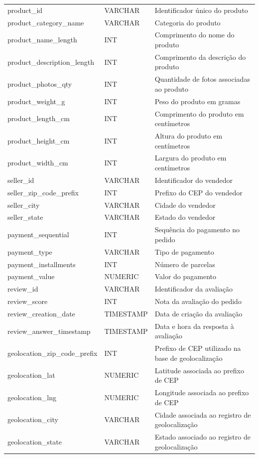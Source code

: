 \documentclass[12pt,a4paper]{article}
\begin{document}
{\begin{longtable}{
    |>{\raggedright\arraybackslash}p{5.5cm}
    |>{\raggedright\arraybackslash}p{2cm}
    |>{\raggedright\arraybackslash}p{6.8cm}|
}
product\_id & VARCHAR & Identificador único do produto \\
product\_category\_name & VARCHAR & Categoria do produto \\
product\_name\_length & INT & Comprimento do nome do produto \\
product\_description\_length & INT & Comprimento da descrição do produto \\
product\_photos\_qty & INT & Quantidade de fotos associadas ao produto \\
product\_weight\_g & INT & Peso do produto em gramas \\
product\_length\_cm & INT & Comprimento do produto em centímetros \\
product\_height\_cm & INT & Altura do produto em centímetros \\
product\_width\_cm & INT & Largura do produto em centímetros \\

seller\_id & VARCHAR & Identificador do vendedor \\
seller\_zip\_code\_prefix & INT & Prefixo do CEP do vendedor \\
seller\_city & VARCHAR & Cidade do vendedor \\
seller\_state & VARCHAR & Estado do vendedor \\

payment\_sequential & INT & Sequência do pagamento no pedido \\
payment\_type & VARCHAR & Tipo de pagamento \\
payment\_installments & INT & Número de parcelas \\
payment\_value & NUMERIC & Valor do pagamento \\

review\_id & VARCHAR & Identificador da avaliação \\
review\_score & INT & Nota da avaliação do pedido \\
review\_creation\_date & TIMESTAMP & Data de criação da avaliação \\
review\_answer\_timestamp & TIMESTAMP & Data e hora da resposta à avaliação \\

geolocation\_zip\_code\_prefix & INT & Prefixo de CEP utilizado na base de geolocalização \\
geolocation\_lat & NUMERIC & Latitude associada ao prefixo de CEP \\
geolocation\_lng & NUMERIC & Longitude associada ao prefixo de CEP \\
geolocation\_city & VARCHAR & Cidade associada ao registro de geolocalização \\
geolocation\_state & VARCHAR & Estado associado ao registro de geolocalização \\ \hline

\end{longtable}
}
\end{document}

